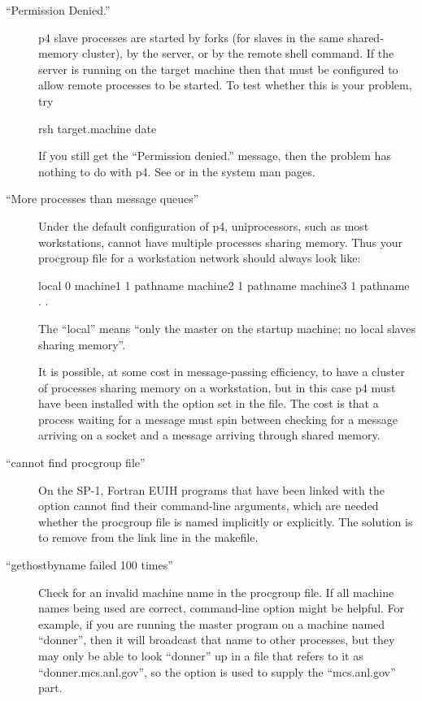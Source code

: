 \begin{description}
\item[``Permission Denied.''] p4 slave processes are started by forks (for
  slaves in the same shared-memory cluster), by the server, or by the remote
  shell command.  If the server is running on the target machine then that
  must be configured to allow remote processes to be started.  To test whether
  this is your problem, try
\begin{example}
    rsh target.machine date
\end{example}
  If you still get the ``Permission denied.'' message, then the problem has
  nothing to do with p4.  See  or  in the
  system man pages.
\item[``More processes than message queues'']  Under the default configuration
  of p4, uniprocessors, such as most workstations, cannot have multiple
  processes sharing memory.  Thus your procgroup file for a workstation network
  should always look like:
\begin{example}
    local 0
    machine1 1 pathname
    machine2 1 pathname
    machine3 1 pathname
       .
       .
\end{example}
  The ``local'' means ``only the master on the startup machine; no local
  slaves sharing memory''.

  It is possible, at some cost in message-passing efficiency, to have a
  cluster of processes sharing memory on a workstation, but in this case p4
  must have been installed with the  option set in the
   file.  The cost is that a process waiting for a message must
  spin between checking for a message arriving on a socket and a message
  arriving through shared memory. 

\item[``cannot find procgroup file''] On the SP-1, Fortran EUIH programs that
  have been linked with the  option cannot find their
  command-line arguments, which are needed whether the procgroup file is named
  implicitly or explicitly.  The solution is to remove  from the
  link line in the makefile.

\item[``gethostbyname failed 100 times''] Check for an invalid machine name
  in the procgroup file.  If all machine names being used are correct,
   command-line option might be helpful.  For example, if you are
  running the master program on a machine named ``donner'', then it will
  broadcast that name to other processes, but they may only be able to look
  ``donner'' up in a file that refers to it as ``donner.mcs.anl.gov'', so
  the  option is used to supply the ``mcs.anl.gov'' part.
  

\end{description}
